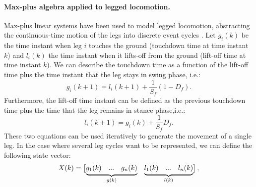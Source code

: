 \documentclass[main.tex]{subfiles}
\begin{document}
\paragraph{Max-plus algebra applied to legged locomotion.}Max-plus linear systems have been used to model legged locomotion, abstracting the continuous-time motion of the legs into discrete event cycles \cite{Lopes2009}. Let $g_i(k)$ be the time instant when leg $i$ touches the ground (touchdown time at time instant $k$) and $l_i(k)$ the time instant when it lifts-off from the ground (lift-off time at time instant $k$). We can describe the touchdown time as a function of the lift-off time plus the time instant that the leg stays in swing phase, i.e.:
\begin{equation}
g_i(k+1) = l_i(k+1) + \frac{1}{S_f}(1 - D_f).
\end{equation}
Furthermore, the lift-off time instant can be defined as the previous touchdown time plus the time that the leg remains in stance phase,i.e.:
\begin{equation}
l_i(k+1) = g_i(k) + \frac{1}{S_f}D_f.
\end{equation}
These two equations can be used iteratively to generate the movement of a single leg. In the case where several leg cycles want to be represented, we can define the following state vector:
\begin{equation}
X(k) = \begin{bmatrix}
\smash{\underbrace{\begin{matrix}g_1(k) & ... & g_n(k)\end{matrix}}_{g(k)}} & \smash{\underbrace{\begin{matrix}
l_1(k) & ... & l_n(k)
\end{matrix}}_{l(k)}}
\end{bmatrix},\label{eq:StateVector}
\end{equation}
\end{document}
